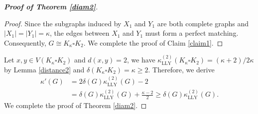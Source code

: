 \documentclass[10pt,a4paper]{article}
\theoremstyle{definition}
\theoremstyle{definition}
\theoremstyle{nonumber}
\newtheorem*{theorem*}{Theorem}
\begin{document}
\begin{proof}[\bf{Proof of Theorem \ref{diam2}}]
\begin{proof}
Since the subgraphs induced by $X_1$ and $Y_1$ are both complete graphs and $|X_1|=|Y_1|=\kappa$, the edges between $X_1$ and $Y_1$ must form a perfect matching. Consequently, $G\cong K_{\kappa}\square K_2$.
We complete the proof of Claim \ref{claim1}.
\end{proof}

Let $x,y\in V(K_{\kappa}\square K_2)$ and $d(x,y)=2$, we have $\kappa_{\mathrm{LLY}}^{(2)}(K_{\kappa}\square K_2)=(\kappa+2)/2\kappa$ by Lemma \ref{distance2} and $\delta(K_{\kappa}\square K_2)=\kappa\geq2$.
Therefore, we derive
\begin{align*}
\kappa'(G) &= 2\delta(G)\kappa_{\mathrm{LLY}}^{(2)}(G)-2\\
&= \delta(G)\kappa_{\mathrm{LLY}}^{(2)}(G)+\frac{\kappa-2}{2} \geq \delta(G) \kappa_{\mathrm{LLY}}^{(2)}(G).
\end{align*}
We complete the proof of Theorem \ref{diam2}.
\end{proof}

\end{document}
